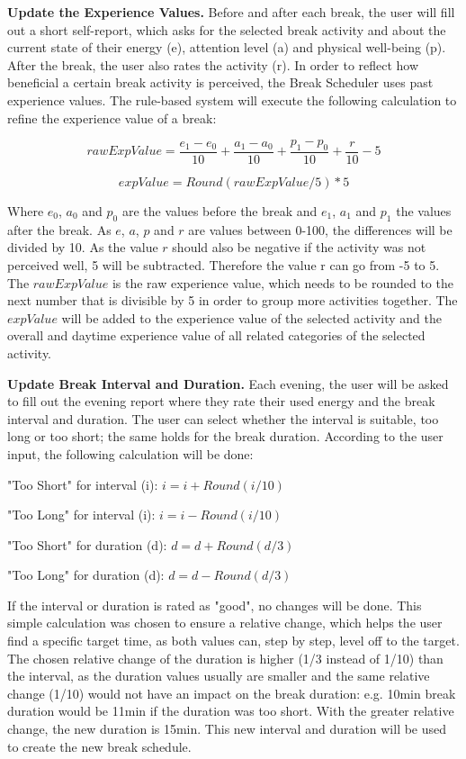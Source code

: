 \documentclass{hasel_thesis}
\begin{document}
\textbf{Update the Experience Values.} Before and after each break, the user will fill out a short self-report, which asks for the selected break activity and about the current state of their energy (e), attention level (a) and physical well-being (p). After the break, the user also rates the activity (r). In order to reflect how beneficial a certain break activity is perceived, the Break Scheduler uses past experience values. The rule-based system will execute the following calculation to refine the experience value of a break:

$$ rawExpValue = \frac{e_1- e_0}{10} + \frac{a_1- a_0}{10} + \frac{p_1-p_0}{10} + \frac{r}{10} -5$$

$$ expValue = Round(rawExpValue/5)*5$$

Where $e_0$, $a_0$ and $p_0$ are the values before the break and $e_1$, $a_1$ and $p_1$ the values after the break. As $e$, $a$, $p$ and $r$ are values between 0-100, the differences will be divided by 10. As the value $r$ should also be negative if the activity was not perceived well, 5 will be subtracted. Therefore the value r can go from -5 to 5. The $rawExpValue$ is the raw experience value, which needs to be rounded to the next number that is divisible by 5 in order to group more activities together. The $expValue$ will be added to the experience value of the selected activity and the overall and daytime experience value of all related categories of the selected activity.

\textbf{Update Break Interval and Duration.} Each evening, the user will be asked to fill out the evening report where they rate their used energy and the break interval and duration. The user can select whether the interval is suitable, too long or too short; the same holds for the break duration. According to the user input, the following calculation will be done:

"Too Short" for interval (i): $ i = i + Round(i/10) $

"Too Long" for interval (i): $ i = i - Round(i/10) $

"Too Short" for duration (d): $ d = d + Round(d/3) $

"Too Long" for duration (d): $ d = d - Round(d/3) $

If the interval or duration is rated as "good", no changes will be done. This simple calculation was chosen to ensure a relative change, which helps the user find a specific target time, as both values can, step by step, level off to the target. The chosen relative change of the duration is higher (1/3 instead of 1/10)  than the interval, as the duration values usually are smaller and the same relative change (1/10) would not have an impact on the break duration: e.g. 10min break duration would be 11min if the duration was too short. With the greater relative change, the new duration is 15min. This new interval and duration will be used to create the new break schedule.
\end{document}
